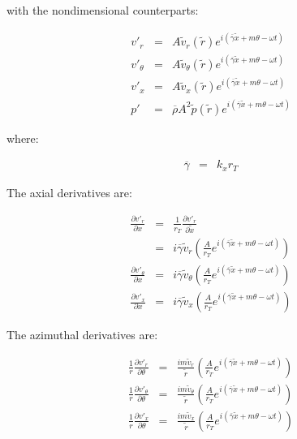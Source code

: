 with the nondimensional counterparts:

\begin{eqnarray}
v'_r &=& A \widetilde{v}_r \left(\widetilde{r} \right) e^{i \left(\overline{\gamma} \widetilde{x} + m \theta - \omega t \right)}
\nonumber
\\
v'_{\theta} &=& A \widetilde{v}_{\theta} \left(\widetilde{r} \right) e^{i \left(\overline{\gamma} \widetilde{x} + m \theta - \omega t \right)}
\nonumber
\\
v'_x &=& A \widetilde{v}_x \left(\widetilde{r} \right) e^{i \left(\overline{\gamma} \widetilde{x} + m \theta - \omega t \right)}
\nonumber
\\
p' &=& \overline{\rho} A^2 \widetilde{p} \left(\widetilde{r} \right) 
e^{i \left(\overline{\gamma} \widetilde{x} + m \theta - \omega t \right)}
\nonumber
\end{eqnarray}

where:

\begin{eqnarray}
\overline{\gamma} &=& k_x r_T
\nonumber
\end{eqnarray}

The axial derivatives are:

\begin{eqnarray}
\frac{\partial v'_r}{\partial x}
&=&
\frac{1}{r_T}
\frac{\partial v'_r}{\partial \widetilde{x}}
\nonumber
\\
&=&
i \overline{\gamma} \widetilde{v}_r
\left(
\frac{A}{r_T}
e^{i \left(\overline{\gamma} \widetilde{x} + m \theta - \omega t \right)}
\right)
\nonumber
\\
\frac{\partial v'_{\theta}}{\partial x}
&=&
i \overline{\gamma} \widetilde{v}_{\theta}
\left(
\frac{A}{r_T}
e^{i \left(\overline{\gamma} \widetilde{x} + m \theta - \omega t \right)}
\right)
\nonumber
\\
\frac{\partial v'_x}{\partial x}
&=&
i \overline{\gamma} \widetilde{v}_x
\left(
\frac{A}{r_T}
e^{i \left(\overline{\gamma} \widetilde{x} + m \theta - \omega t \right)}
\right)
\nonumber
\end{eqnarray}

The azimuthal derivatives are:

\begin{eqnarray}
\frac{1}{r}
\frac{\partial v'_r}{\partial \theta}
&=&
\frac{i m \widetilde{v}_r}{\widetilde{r}}
\left(
\frac{A}{r_T}
e^{i \left(\overline{\gamma} \widetilde{x} + m \theta - \omega t \right)}
\right)
\nonumber
\\
\frac{1}{r}
\frac{\partial v'_{\theta}}{\partial \theta}
&=&
\frac{i m \widetilde{v}_{\theta}}{\widetilde{r}}
\left(
\frac{A}{r_T}
e^{i \left(\overline{\gamma} \widetilde{x} + m \theta - \omega t \right)}
\right)
\nonumber
\\
\frac{1}{r}
\frac{\partial v'_x}{\partial \theta}
&=&
\frac{i m \widetilde{v}_x}{\widetilde{r}}
\left(
\frac{A}{r_T}
e^{i \left(\overline{\gamma} \widetilde{x} + m \theta - \omega t \right)}
\right)
\nonumber
\end{eqnarray}

